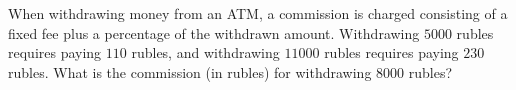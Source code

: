 When withdrawing money from an ATM, a commission is charged consisting of a fixed fee plus a percentage of the withdrawn amount. Withdrawing $5000$ rubles requires paying $110$ rubles, and withdrawing $11000$ rubles requires paying $230$ rubles. What is the commission (in rubles) for withdrawing $8000$ rubles?
